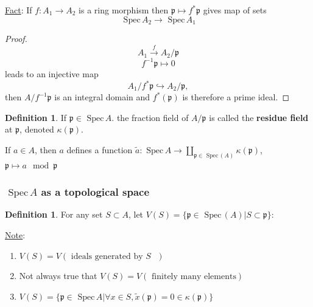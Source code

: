 \documentclass[11pt]{article}
\theoremstyle{definition}
\newtheorem{dfn}[thm]{Definition}
\newcommand{\spec}{\text{ Spec}\,}
\newcommand{\scp}{{\mathfrak p}}
\newcommand{\lrta}{\longrightarrow}
\newcommand{\inj}{\hookrightarrow}
\begin{document}
\underline{Fact}: If $f: A_1\lrta A_2$ is a ring morphism then $\scp\mapsto f^{*}\scp$ gives map of sets
$$
\spec A_2\lrta \spec A_1
$$
\begin{proof}
$$A_1\overset{f}{\lrta}A_2/\scp$$
$$f^{-1}\scp\mapsto 0$$
 leads to an injective map
 $$
A_1/f^{*}\scp\inj A_2/\scp,
$$ then $A/f^{-1}\scp$ is an integral domain and $f^*(\scp)$ is therefore a prime ideal.
\end{proof}

\begin{dfn}
If $\scp\in\spec A$. the fraction field of $A/\scp$ is called the \textbf{residue field} at $\scp$, denoted $\kappa(\scp)$. 
\end{dfn}
If $a\in A$, then $a$ defines a function
$\tilde{a}:\spec A\lrta\coprod_{\scp\in \spec(A)}\kappa(\scp)$, $\scp\mapsto a\mod \scp$


\subsubsection{$\spec A$ as a topological space}
\begin{dfn}
For any set $S\subset A$, let $V(S)=\{\scp\in\spec(A)|S\subset \scp\}$:
\end{dfn}
\underline{Note}: 
\begin{enumerate}[label=(\arabic*)]
\item $V(S)=V(\text{ ideals generated by $S$ })$
\item Not always true that $V(S)=V(\text{ finitely many elements})$
\item $V(S)=\{\scp\in\spec A|\forall x\in S, \tilde{x}(\scp)=0\in\kappa(\scp)\}$
\end{enumerate}
\end{document}
